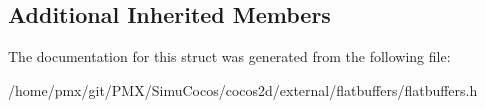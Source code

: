 \subsection*{Additional Inherited Members}


The documentation for this struct was generated from the following file\+:\begin{DoxyCompactItemize}
\item 
/home/pmx/git/\+P\+M\+X/\+Simu\+Cocos/cocos2d/external/flatbuffers/flatbuffers.\+h\end{DoxyCompactItemize}
